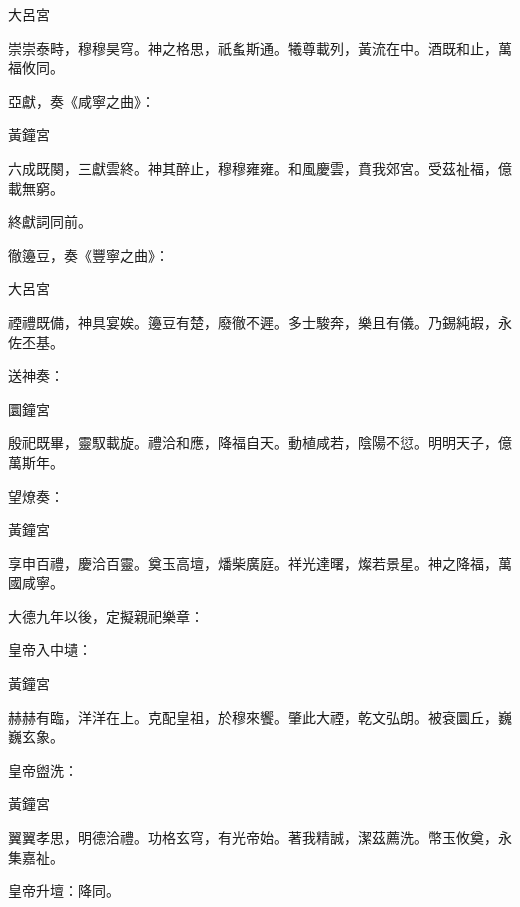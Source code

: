 \begin{pinyinscope}
 大呂宮



 崇崇泰畤，穆穆昊穹。神之格思，祇蚃斯通。犧尊載列，黃流在中。酒既和止，萬福攸同。



 亞獻，奏《咸寧之曲》：



 黃鐘宮



 六成既闋，三獻雲終。神其醉止，穆穆雍雍。和風慶雲，賁我郊宮。受茲祉福，億載無窮。



 終獻詞同前。



 徹籩豆，奏《豐寧之曲》：



 大呂宮



 禋禮既備，神具宴娭。籩豆有楚，廢徹不遲。多士駿奔，樂且有儀。乃錫純嘏，永佐丕基。



 送神奏：



 圜鐘宮



 殷祀既畢，靈馭載旋。禮洽和應，降福自天。動植咸若，陰陽不愆。明明天子，億萬斯年。



 望燎奏：



 黃鐘宮



 享申百禮，慶洽百靈。奠玉高壇，燔柴廣庭。祥光達曙，燦若景星。神之降福，萬國咸寧。



 大德九年以後，定擬親祀樂章：



 皇帝入中壝：



 黃鐘宮



 赫赫有臨，洋洋在上。克配皇祖，於穆來饗。肇此大禋，乾文弘朗。被袞圜丘，巍巍玄象。



 皇帝盥洗：



 黃鐘宮



 翼翼孝思，明德洽禮。功格玄穹，有光帝始。著我精誠，潔茲薦洗。幣玉攸奠，永集嘉祉。



 皇帝升壇：降同。




\end{pinyinscope}
